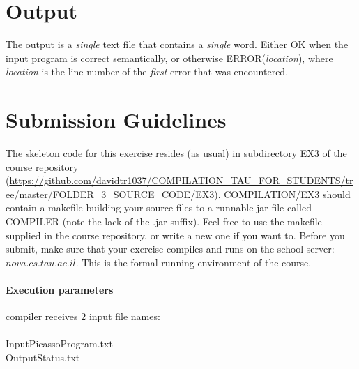 \documentclass{article}
\begin{document}
\section{Output}
The output is a \textit{single} text file that contains a \textit{single} word.
Either OK when the input program is correct semantically,
or otherwise ERROR(\textit{location}), where \textit{location}
is the line number of the \textit{first} error that was encountered.

\section{Submission Guidelines}
The skeleton code for this exercise resides (as usual)
in subdirectory EX3 of the course repository (\url{https://github.com/davidtr1037/COMPILATION_TAU_FOR_STUDENTS/tree/master/FOLDER_3_SOURCE_CODE/EX3}).
COMPILATION/EX3 should contain a makefile building your source files to a
runnable jar file called COMPILER (note the lack of the .jar suffix).
Feel free to use the makefile supplied in the course repository,
or write a new one if you want to. 
Before you submit, make sure that your exercise compiles and runs
on the school server: $nova.cs.tau.ac.il$.
This is the formal running environment of the course.

\paragraph{Execution parameters}
compiler receives $2$ input file names:\\ \\
InputPicassoProgram.txt\\
OutputStatus.txt
\end{document}
